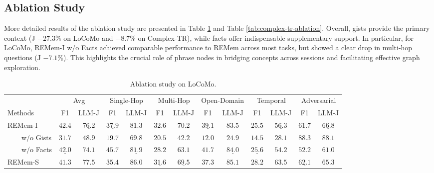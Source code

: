 \documentclass{article} %
\newcommand{\ours}{REMem\xspace}
\begin{document}
\subsection{Ablation Study}
\label{subsec:appendix-ablation-study}

More detailed results of the ablation study are presented in Table \ref{tab:locomo-ablation} and Table \ref{tab:complex-tr-ablation}.
Overall, gists provide the primary context (J $-27.3\%$ on LoCoMo and $-8.7\%$ on Complex-TR), while facts offer indispensable supplementary support.
In particular, for LoCoMo, \ours-I w/o Facts achieved comparable performance to \ours across most tasks, but showed a clear drop in multi-hop questions (J $-7.1\%$). This highlights the crucial role of phrase nodes in bridging concepts across sessions and facilitating effective graph exploration.


\begin{table}[tbh]
\centering
\small
\caption{Ablation study on LoCoMo.}
\vspace{0.2em}
\addtolength{\tabcolsep}{-3pt}
\begin{tabular}{l|cc|cc|cc|cc|cc|cc}
\toprule
 & \multicolumn{2}{c|}{Avg} & \multicolumn{2}{c|}{Single-Hop} & \multicolumn{2}{c|}{Multi-Hop} & \multicolumn{2}{c|}{Open-Domain} & \multicolumn{2}{c|}{Temporal} & \multicolumn{2}{c}{Adversarial} \\
 \cmidrule(lr){2-3} \cmidrule(lr){4-5} \cmidrule(lr){6-7} \cmidrule(lr){8-9} \cmidrule(lr){10-11} \cmidrule(lr){12-13}
Methods & F1 & LLM-J & F1 & LLM-J & F1 & LLM-J & F1 & LLM-J & F1 & LLM-J & F1 & LLM-J \\ \midrule
\ours-I & $\mathbf{42.4}$  & $\underline{76.2}$ & $\underline{37.9}$ & $81.3$ & $\mathbf{32.6}$ & $\mathbf{70.2}$ & $\underline{39.1}$ & $83.5$ & $25.5$ & $\underline{56.3}$ & $61.7$ & $\underline{66.8}$ \\
\ \ \ \ w/o Gists & $31.7$ & $48.9$ & $19.7$ & $69.8$ & $20.5$ & $42.2$ & $12.0$ & $24.9$  & $14.5$ & $28.1$ & $\mathbf{88.3}$ & $\mathbf{88.1}$ \\
\ \ \ \ w/o Facts & $\underline{42.0}$ & $74.1$ & $\mathbf{45.7}$ & $\underline{81.9}$ & $28.2$ & $63.1$ & $\mathbf{41.7}$ & $\underline{84.0}$ & $\underline{25.6}$ & $54.2$ & $52.2$ & $61.0$ \\
\ours-S & $41.3$ & $\mathbf{77.5}$ & $35.4$ & $\mathbf{86.0}$ & $\underline{31.6}$ & $\underline{69.5}$ & $37.3$ & $\mathbf{85.1}$ & $\mathbf{28.2}$ & $\mathbf{63.5}$ & $\underline{62.1}$ & $65.3$ \\ 
\bottomrule
\end{tabular}
\label{tab:locomo-ablation}
\end{table}
\end{document}
